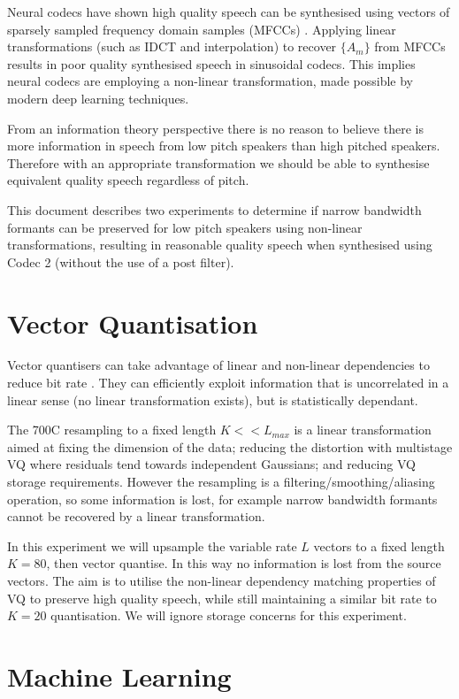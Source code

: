 \documentclass{article}
\begin{document}
Neural codecs have shown high quality speech can be synthesised using vectors of sparsely sampled frequency domain samples (MFCCs) \cite{davis1980comparison}.  Applying linear transformations (such as IDCT and interpolation) to recover $\{A_m\}$ from MFCCs results in poor quality synthesised speech in sinusoidal codecs.  This implies neural codecs are employing a non-linear transformation, made possible by modern deep learning techniques.

From an information theory perspective there is no reason to believe there is more information in speech from low pitch speakers than high pitched speakers. Therefore with an appropriate transformation we should be able to synthesise equivalent quality speech regardless of pitch.

This document describes two experiments to determine if narrow bandwidth formants can be preserved for low pitch speakers using non-linear transformations, resulting in reasonable quality speech when synthesised using Codec 2 (without the use of a post filter).  

\section{Vector Quantisation}
\label{sec:vq}

Vector quantisers can take advantage of linear and non-linear dependencies to reduce bit rate \cite{makhoul1985vector}.  They can efficiently exploit information that is uncorrelated in a linear sense (no linear transformation exists), but is statistically dependant.

The 700C resampling to a fixed length $K<<L_{max}$ is a linear transformation aimed at fixing the dimension of the data; reducing the distortion with multistage VQ where residuals tend towards independent Gaussians; and reducing VQ storage requirements.  However the resampling is a filtering/smoothing/aliasing operation, so some information is lost, for example narrow bandwidth formants cannot be recovered by a linear transformation.

In this experiment we will upsample the variable rate $L$ vectors to a fixed length $K=80$, then vector quantise.  In this way no information is lost from the source vectors.  The aim is to utilise the non-linear dependency matching properties of VQ to preserve high quality speech, while still maintaining a similar bit rate to $K=20$ quantisation.  We will ignore storage concerns for this experiment. 

\section{Machine Learning}
\end{document}
